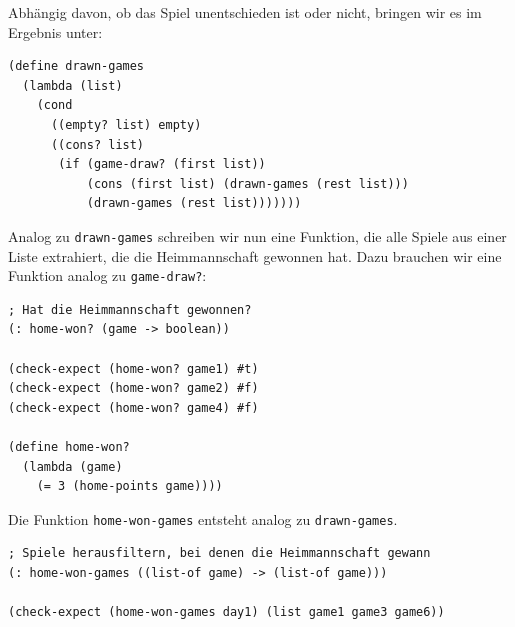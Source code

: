 %
Abhängig davon, ob das Spiel unentschieden ist oder nicht, bringen wir
es im Ergebnis unter:
%
\begin{lstlisting}
(define drawn-games
  (lambda (list)
    (cond
      ((empty? list) empty)
      ((cons? list)
       (if (game-draw? (first list))
           (cons (first list) (drawn-games (rest list)))
           (drawn-games (rest list)))))))
\end{lstlisting}
%
Analog zu \lstinline{drawn-games} schreiben wir nun eine
Funktion, die alle Spiele aus einer Liste extrahiert, die die Heimmannschaft
gewonnen hat.  Dazu brauchen wir eine Funktion analog zu
\lstinline{game-draw?}:
%
\begin{lstlisting}
; Hat die Heimmannschaft gewonnen?
(: home-won? (game -> boolean))

(check-expect (home-won? game1) #t)
(check-expect (home-won? game2) #f)
(check-expect (home-won? game4) #f)

(define home-won?
  (lambda (game)
    (= 3 (home-points game))))
\end{lstlisting}
%
Die Funktion \lstinline{home-won-games} entsteht analog zu
\lstinline{drawn-games}.\enlargethispage{1ex}
%
\begin{lstlisting}
; Spiele herausfiltern, bei denen die Heimmannschaft gewann
(: home-won-games ((list-of game) -> (list-of game)))

(check-expect (home-won-games day1) (list game1 game3 game6))
\end{lstlisting}

